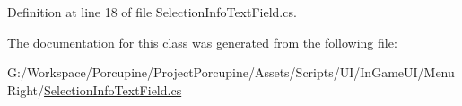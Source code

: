 Definition at line 18 of file Selection\+Info\+Text\+Field.\+cs.



The documentation for this class was generated from the following file\+:\begin{DoxyCompactItemize}
\item 
G\+:/\+Workspace/\+Porcupine/\+Project\+Porcupine/\+Assets/\+Scripts/\+U\+I/\+In\+Game\+U\+I/\+Menu\+Right/\hyperlink{_selection_info_text_field_8cs}{Selection\+Info\+Text\+Field.\+cs}\end{DoxyCompactItemize}
